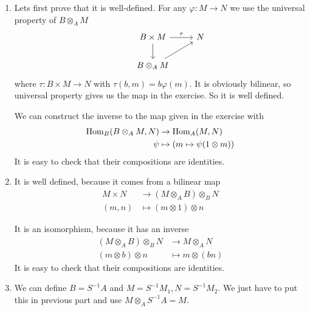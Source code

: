 \newcommand{\sheet}{7}




\maketitle

\begin{exercise}{1}
    \begin{enumerate}
        \item Lets first prove that it is well-defined. For any $\varphi \colon
            M \rightarrow N$ we
            use the universal property of $B \otimes_A M$
            \[
                \begin{tikzcd}
                    &B \times M \arrow{d} \arrow{r}{\tau} &N \\
                    &B \otimes_A M \arrow{ur}
                \end{tikzcd}
            \]
            where $\tau \colon B \times M \rightarrow N$ with $\tau(b, m) = b
            \varphi(m)$. It is obviously bilinear, so universal property gives
            us the map in the exercise. So it is well defined.

            We can construct the inverse to the map given in the exercise with
            \begin{align*}
                \operatorname{Hom}_B(B \otimes_A M, N) &\rightarrow \operatorname{Hom}_A(M, N) \\
                \psi &\mapsto (m \mapsto \psi(1 \otimes m))
            \end{align*}
            It is easy to check that their compositions are identities.

        \item It is well defined, because it comes from a bilinear map
            \begin{align*}
                M \times N &\rightarrow (M \otimes_A B) \otimes_B N \\
                (m, n) &\mapsto (m \otimes 1) \otimes n
            \end{align*}

            It is an isomorphism, because it has an inverse
            \begin{align*}
                (M \otimes_A B) \otimes_B N &\rightarrow M \otimes_A N \\
                (m \otimes b) \otimes n &\mapsto m \otimes (b n)
            \end{align*}
            It is easy to check that their compositions are identities.

        \item We can define $B = S^{-1} A$ and $M = S^{-1} M_1, N = S^{-1} M_2$.
            We just have to put this in previous part and use $M \otimes_A
            S^{-1} A = M$.
    \end{enumerate}
\end{exercise}

